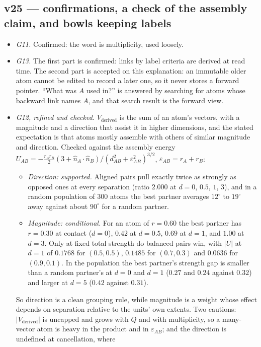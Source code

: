 \documentclass[11pt]{article}
\begin{document}
\subsection*{v25 --- confirmations, a check of the assembly claim, and bowls keeping labels}
\begin{itemize}
\item \emph{G11.} Confirmed: the word is multiplicity, used loosely.
\item \emph{G13.} The first part is confirmed: links by label criteria
are derived at read time. The second part is accepted on this
explanation: an immutable older atom cannot be edited to record a later
one, so it never stores a forward pointer. ``What was $A$ used in?'' is
answered by searching for atoms whose backward link names $A$, and that
search result is the forward view.
\item \emph{G12, refined and checked.} $V_{\text{derived}}$ is the sum of
an atom's vectors, with a magnitude and a direction that assist it in
higher dimensions, and the stated expectation is that atoms mostly
assemble with others of similar magnitude and direction. Checked against
the assembly energy $U_{AB}=-\tfrac{r_Ar_B}{2}(3+\hat n_A\!\cdot\!\hat n_B)
/(d_{AB}^2+\varepsilon_{AB}^2)^{3/2}$, $\varepsilon_{AB}=r_A+r_B$:
\begin{itemize}
\item \emph{Direction: supported.} Aligned pairs pull exactly twice as
strongly as opposed ones at every separation (ratio $2.000$ at $d=0$,
$0.5$, $1$, $3$), and in a random population of $300$ atoms the best
partner averages $12^\circ$ to $19^\circ$ away against about $90^\circ$
for a random partner.
\item \emph{Magnitude: conditional.} For an atom of $r=0.60$ the best
partner has $r=0.30$ at contact ($d=0$), $0.42$ at $d=0.5$, $0.69$ at
$d=1$, and $1.00$ at $d=3$. Only at fixed total strength do balanced
pairs win, with $|U|$ at $d=1$ of $0.1768$ for $(0.5,0.5)$, $0.1485$ for
$(0.7,0.3)$ and $0.0636$ for $(0.9,0.1)$. In the population the best
partner's strength gap is smaller than a random partner's at $d=0$ and
$d=1$ ($0.27$ and $0.24$ against $0.32$) and larger at $d=5$ ($0.42$
against $0.31$).
\end{itemize}
So direction is a clean grouping rule, while magnitude is a weight whose
effect depends on separation relative to the units' own extents. Two
cautions: $|V_{\text{derived}}|$ is uncapped and grows with $Q$ and with
multiplicity, so a many-vector atom is heavy in the product and in
$\varepsilon_{AB}$; and the direction is undefined at cancellation, where

\end{itemize}
\end{document}
